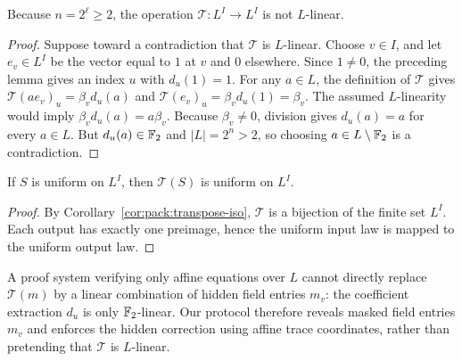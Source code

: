 \begin{proposition}\label{prop:pack:not-L-linear}
Because $n=2^\ell\geq2$,
the operation $\mathcal T:L^I\to L^I$
is not $L$-linear.
\end{proposition}
\begin{proof}
Suppose toward a contradiction that $\mathcal T$
is $L$-linear.
Choose $v\in I$, and let $e_v\in L^I$
be the vector equal to $1$ at $v$ and
$0$ elsewhere. Since $1\neq0$, the preceding
lemma gives an index $u$ with $d_u(1)=1$.
For any $a\in L$, the definition of
$\mathcal T$ gives
$\mathcal T(ae_v)_u=\beta_vd_u(a)$
and $\mathcal T(e_v)_u=\beta_vd_u(1)=\beta_v$.
The assumed $L$-linearity would imply
$\beta_vd_u(a)=a\beta_v$.
Because $\beta_v\neq0$, division gives
$d_u(a)=a$ for every $a\in L$.
But $d_u(a)\in\mathbb{F}_2$ and $|L|=2^n>2$,
so choosing $a\in L\setminus\mathbb{F}_2$
is a contradiction.
\end{proof}

\begin{lemma}\label{lem:pack:transpose-uniform}
If $S$ is uniform on $L^I$, then
$\mathcal T(S)$ is uniform on $L^I$.
\end{lemma}
\begin{proof}
By Corollary~\ref{cor:pack:transpose-iso},
$\mathcal T$ is a bijection of the finite
set $L^I$. Each output has exactly one
preimage, hence the uniform input law
is mapped to the uniform output law.
\end{proof}

\begin{remark}
A proof system verifying only affine equations
over $L$ cannot directly replace
$\mathcal T(m)$ by a linear combination
of hidden field entries $m_v$:
the coefficient extraction $d_u$ is only
$\mathbb{F}_2$-linear. Our protocol therefore
reveals masked field entries $m_v$ and
enforces the hidden correction using
affine trace coordinates, rather than
pretending that $\mathcal T$ is $L$-linear.
\end{remark}
